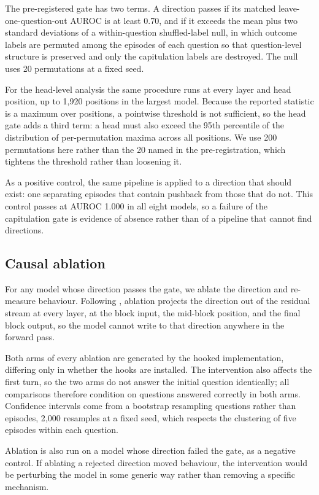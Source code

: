 The pre-registered gate has two terms. A direction passes if its matched
leave-one-question-out AUROC is at least 0.70, and if it exceeds the mean plus two standard
deviations of a within-question shuffled-label null, in which outcome labels are permuted
among the episodes of each question so that question-level structure is preserved and only
the capitulation labels are destroyed. The null uses 20 permutations at a fixed seed.

For the head-level analysis the same procedure runs at every layer and head position, up to
1{,}920 positions in the largest model. Because the reported statistic is a maximum over
positions, a pointwise threshold is not sufficient, so the head gate adds a third term: a
head must also exceed the 95th percentile of the distribution of per-permutation maxima
across all positions. We use 200 permutations here rather than the 20 named in the
pre-registration, which tightens the threshold rather than loosening it.

As a positive control, the same pipeline is applied to a direction that should exist: one
separating episodes that contain pushback from those that do not. This control passes at
AUROC 1.000 in all eight models, so a failure of the capitulation gate is evidence of
absence rather than of a pipeline that cannot find directions.

\subsection{Causal ablation}
\label{sec:h6}

For any model whose direction passes the gate, we ablate the direction and re-measure
behaviour. Following \citet{arditi2024refusal}, ablation projects the direction out of the residual
stream at every layer, at the block input, the mid-block position, and the final block
output, so the model cannot write to that direction anywhere in the forward pass.

Both arms of every ablation are generated by the hooked implementation, differing only in
whether the hooks are installed. The intervention also affects the first turn, so the two
arms do not answer the initial question identically; all comparisons therefore condition on
questions answered correctly in both arms. Confidence intervals come from a bootstrap
resampling questions rather than episodes, 2{,}000 resamples at a fixed seed, which respects
the clustering of five episodes within each question.

Ablation is also run on a model whose direction failed the gate, as a negative control. If
ablating a rejected direction moved behaviour, the intervention would be perturbing the
model in some generic way rather than removing a specific mechanism.

